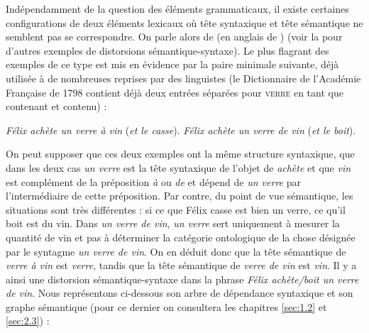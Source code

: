     {Indépendamment de la question des éléments grammaticaux, il existe certaines configurations de deux éléments lexicaux où tête syntaxique et tête sémantique ne semblent pas se correspondre. On parle alors de  (en anglais de ) (voir la  pour d'autres exemples de distorsions sémantique-syntaxe). Le plus flagrant des exemples de ce type est mis en évidence par la paire minimale suivante, déjà utilisée à de nombreuses reprises par des linguistes (le Dictionnaire de l’Académie Française de 1798 contient déjà deux entrées séparées pour \textsc{verre} en tant que contenant et contenu) :

    \ea
    \ea  \textit{Félix achète un verre à vin} (\textit{et le casse}).\z
    \ex  \textit{Félix achète un verre de vin} (\textit{et le boit}).\label{ex:3-3-24b}
\z
    \z

    On peut supposer que ces deux exemples ont la même structure syntaxique, que dans les deux cas \textit{un verre} est la tête syntaxique de l’objet de \textit{achète} et que \textit{vin} est complément de la préposition \textit{à} ou \textit{de} et dépend de \textit{un verre} par l’intermédiaire de cette préposition. Par contre, du point de vue sémantique, les situations sont très différentes : si ce que Félix casse est bien un verre, ce qu’il boit est du vin. Dans \textit{un verre de vin}, \textit{un verre} sert uniquement à mesurer la quantité de vin et pas à déterminer la catégorie ontologique de la chose désignée par le syntagme \textit{un verre de vin}. On en déduit donc que la tête sémantique de \textit{verre à vin} est \textit{verre}, tandis que la tête sémantique de \textit{verre de vin} est \textit{vin}. Il y a ainsi une distorsion sémantique-syntaxe dans la phrase \textit{Félix achète/boit un verre de vin}. Nous représentons ci-dessous son arbre de dépendance syntaxique et son graphe sémantique (pour ce dernier on consultera les chapitres \ref{sec:1.2} et \ref{sec:2.3}) :

}
